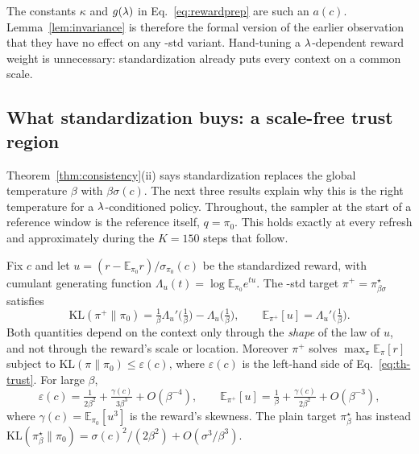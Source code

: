 The constants $\kappa$ and $g(\lambda)$ in Eq.~\eqref{eq:rewardprep} are such an
$a(c)$. Lemma~\ref{lem:invariance} is therefore the formal version of the
earlier observation that they have no effect on any -std variant. Hand-tuning
a $\lambda$-dependent reward weight is unnecessary: standardization already puts
every context on a common scale.

\subsection{What standardization buys: a scale-free trust region}
\label{sec:th-std}

Theorem~\ref{thm:consistency}(ii) says standardization replaces the global
temperature $\beta$ with $\beta\sigma(c)$. The next three results explain why
this is the right temperature for a $\lambda$-conditioned policy. Throughout, the
sampler at the start of a reference window is the reference itself,
$q = \pi_0$. This holds exactly at every refresh and approximately during the
$K = 150$ steps that follow.

\begin{proposition}
\label{prop:trust}
Fix $c$ and let $u = (r - \mathbb{E}_{\pi_0}r)/\sigma_{\pi_0}(c)$ be the
standardized reward, with cumulant generating function
$\Lambda_u(t) = \log\mathbb{E}_{\pi_0}e^{tu}$. The \rrebel{}-std target
$\pi^+ = \pi^\star_{\beta\sigma}$ satisfies
\begin{equation}
  \mathrm{KL}(\pi^+\|\pi_0) = \tfrac{1}{\beta}\Lambda_u'\!\bigl(\tfrac1\beta\bigr)
                              - \Lambda_u\!\bigl(\tfrac1\beta\bigr),
  \qquad
  \mathbb{E}_{\pi^+}[u] = \Lambda_u'\!\bigl(\tfrac1\beta\bigr).
  \label{eq:th-trust}
\end{equation}
Both quantities depend on the context only through the \emph{shape} of the law
of $u$, and not through the reward's scale or location. Moreover $\pi^+$ solves
$\max_\pi \mathbb{E}_\pi[r]$ subject to
$\mathrm{KL}(\pi\|\pi_0) \le \varepsilon(c)$, where $\varepsilon(c)$ is the
left-hand side of Eq.~\eqref{eq:th-trust}. For large $\beta$,
\begin{equation}
  \varepsilon(c) = \tfrac{1}{2\beta^2} + \tfrac{\gamma(c)}{3\beta^3} + O(\beta^{-4}),
  \qquad
  \mathbb{E}_{\pi^+}[u] = \tfrac{1}{\beta} + \tfrac{\gamma(c)}{2\beta^2} + O(\beta^{-3}),
\end{equation}
where $\gamma(c) = \mathbb{E}_{\pi_0}[u^3]$ is the reward's skewness. The plain
target $\pi^\star_\beta$ has instead
$\mathrm{KL}(\pi^\star_\beta\|\pi_0) = \sigma(c)^2/(2\beta^2) + O(\sigma^3/\beta^3)$.
\end{proposition}


